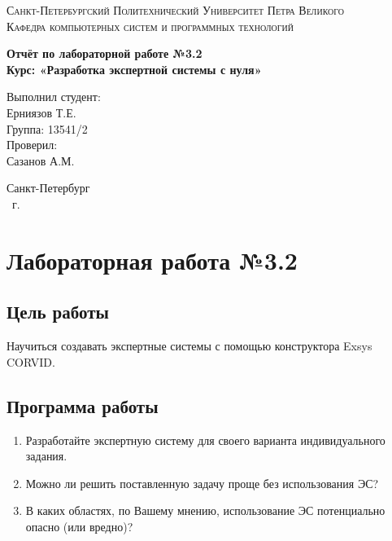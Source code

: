 \documentclass[14pt,a4paper,report]{report}
\begin{document}
\def\contentsname{Содержание}

\begin{titlepage}
	\begin{center}
		\textsc{Санкт-Петербургский Политехнический 
			Университет Петра Великого\\[5mm]
			Кафедра компьютерных систем и программных технологий}
		
		\vfill
		
		\textbf{Отчёт по лабораторной работе №3.2\\[3mm]
			Курс: «Разработка экспертной системы с нуля»\\[41mm]
		}
	\end{center}
	
	\hfill
	\begin{minipage}{.4\textwidth}
		Выполнил студент:\\[2mm] 
		Ерниязов Т.Е.\\
		Группа: 13541/2\\[5mm]
		
		Проверил:\\[2mm] 
		Сазанов А.М.
	\end{minipage}
	\vfill
	\begin{center}
		Санкт-Петербург\\ \the\year\ г.
	\end{center}
\end{titlepage}

\tableofcontents
\clearpage

\chapter{Лабораторная работа №3.2}

\section{Цель работы}

Научиться создавать экспертные системы с помощью конструктора Exsys CORVID.

\section{Программа работы}

\begin{enumerate}
	\item Разработайте экспертную систему для своего варианта индивидуального задания.
	\item Можно ли решить поставленную задачу проще без использования ЭС?
	\item В каких областях, по Вашему мнению, использование ЭС потенциально опасно (или вредно)?
\end{enumerate}
\end{document}
